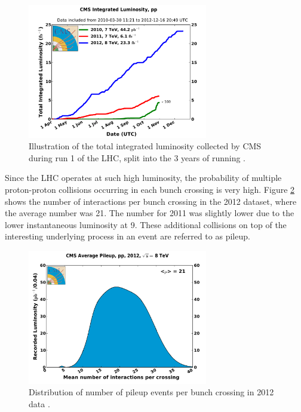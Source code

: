 \begin{figure}[htbp]
   \includegraphics[width=0.7\textwidth]{plots/detector/int_lumi_cumulative_pp_2.pdf}
\caption[Illustration of the total integrated luminosity collected by CMS during run 1 of the
LHC.]{Illustration of the total integrated luminosity collected by CMS during run 1 of the
LHC, split into the 3 years of running \cite{cmslumitwiki}.}
\label{fig:detlumi}
\end{figure}

Since the LHC operates at such high luminosity, the probability of multiple
proton-proton collisions occurring in each bunch crossing is very high. Figure 
\ref{fig:PU} shows the number of interactions per bunch crossing in the
2012 dataset, where the average number was 21. The number for 2011 was slightly
lower due to the lower instantaneous luminosity at 9. 
These additional collisions on top of the interesting
underlying process in an event are referred to as pileup.

\begin{figure}[htbp]
   \includegraphics[width=0.7\textwidth]{plots/detector/pileup_pp_2012-2.pdf}
\caption[Distribution of number of pileup events per bunch crossing in 2012
data.]{Distribution of number of pileup events per bunch crossing in 2012 data \cite{cmslumitwiki}.}
\label{fig:PU}
\end{figure}

